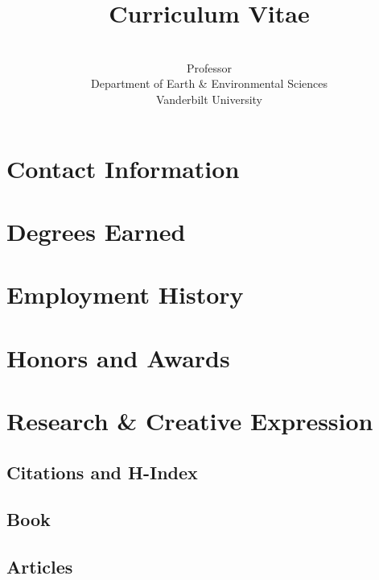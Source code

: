 \documentclass[10pt]{article}
\title{Curriculum Vitae}
\date{\thedate}
\author{\fullname\\
\normalsize Professor\\
Department of Earth \& Environmental Sciences\\
Vanderbilt University}
\begin{document}
\maketitle
\tableofcontents

\section{Contact Information}


\section{Degrees Earned}
\begin{description}
  
\end{description}
\section{Employment History}


\section{Honors and Awards}


\section{Research \& Creative Expression}
    \subsection{Citations and H-Index}
    
    \nocite{*}%
  \subsection[Book]{Book}
        \begin{refsection}
            \nocite{*}
            \printbibliography[heading=none,type=book]
        \end{refsection}
  \subsection[Articles]{Articles}
    \begin{refsection}
        \nocite{*}
        \printbibliography[heading=none,type=article]
    \end{refsection}
\end{document}
